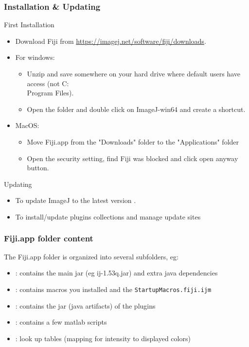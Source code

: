 \documentclass[ignorenonframetext,aspectratio=169,10pt,xcolor=table]{beamer}
\begin{document}
\begin{frame} \frametitle{Installation \& Updating}

  \begin{block}{First Installation}
    \begin{itemize}
    \item Download Fiji from  \url{https://imagej.net/software/fiji/downloads}.
    \item For windows:
    \begin{itemize}
      \item Unzip and save somewhere on your hard drive where default
      users have access (not C:\\Program Files).
      \item Open the folder and double click on ImageJ-win64
      and create a shortcut.
    \end{itemize}
    \item MacOS: 
    \begin{itemize}
      \item Move Fiji.app from the "Downloads" folder to the "Applications" folder
     \item Open the security setting, find Fiji was blocked and click open anyway button.
    \end{itemize}
    \end{itemize}
  \end{block}

  \begin{block}{Updating}
    \begin{itemize}
    \item To update ImageJ to the latest version .
    \item To install/update plugins collections and manage update
      sites 
    \end{itemize}
  \end{block}

\end{frame}

\begin{frame}  \frametitle{Fiji.app folder content}

  The Fiji.app folder is organized into several subfolders, eg:\\[1em]

  \begin{itemize} \setlength\itemsep{1em}
  \item {}: contains the main jar (eg ij-1.53q.jar) and
    extra java dependencies
  \item {}: contains macros you installed and the
    \texttt{StartupMacros.fiji.ijm}
  \item {}: contains the jar (java artifacts) of the
    plugins
  \item {}: contains a few matlab scripts
  \item {}: look up tables (mapping for intensity to displayed
    colors)
  \end{itemize}

\end{frame}
\end{document}
